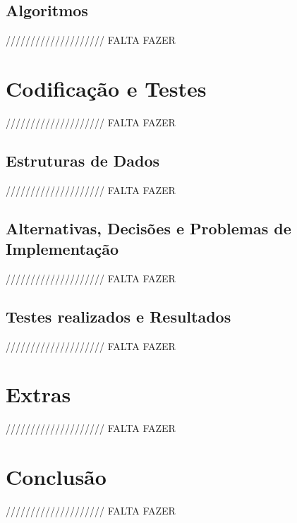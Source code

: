 \documentclass[11pt,a4paper]{report}
\begin{document}
\section{Algoritmos}

//////////////////// FALTA FAZER

\chapter{Codificação e Testes}
\label{chap:codificacao}

//////////////////// FALTA FAZER

\section{Estruturas de Dados}

//////////////////// FALTA FAZER

\section{Alternativas, Decisões e Problemas de Implementação}

//////////////////// FALTA FAZER

\section{Testes realizados e Resultados}

//////////////////// FALTA FAZER

\chapter{Extras}
\label{chap:extras}

//////////////////// FALTA FAZER

\chapter{Conclusão}
\label{chap:concl}

//////////////////// FALTA FAZER
\end{document}
